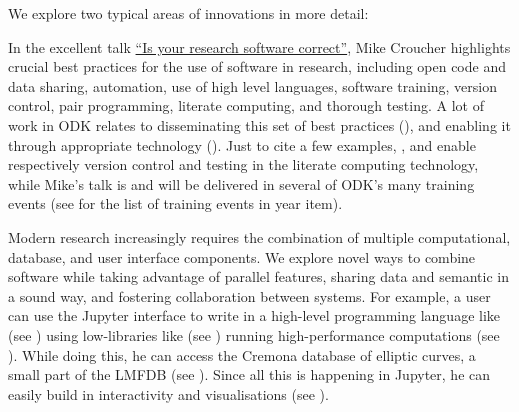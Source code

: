 \documentclass{deliverablereport}
\begin{document}
We explore two typical areas of innovations in more detail:
\begin{description}
\item[Best practice and tools for correct and reproducible research]
  In the excellent talk
  \href{https://mikecroucher.github.io/MLPM_talk/}{``Is your research
    software correct''}, Mike Croucher highlights crucial best
  practices for the use of software in research, including open code
  and data sharing, automation, use of high level languages, software
  training, version control, pair programming, literate computing, and thorough
  testing. A lot of work in ODK relates to disseminating this set of
  best practices (), and enabling it through
  appropriate technology ().  Just to cite a few
  examples, , and
   enable respectively version control
  and testing in the \Jupyter literate computing technology, while
  Mike's talk is and will be delivered in several of ODK's many
  training events (see  for the list
  of training events in year item).

\item[Multisystem architecture]
  Modern research increasingly requires the combination of multiple
  computational, database, and user interface components.
  We explore novel ways to combine software while taking
  advantage of parallel features, sharing data and
  semantic in a sound way, and fostering
  collaboration between systems.
  For example, a user can use the Jupyter interface to write
  in a high-level programming language like \Sage (see )
  using low-libraries like \Pari (see )
  running high-performance computations (see ).
  While doing this, he can access
  the Cremona database of elliptic curves, a small part of the LMFDB
  (see ).
  Since all this is happening in Jupyter, he can easily build in
  interactivity and visualisations (see ).

\item {}


\end{description}
\end{document}
